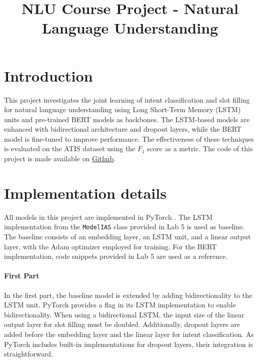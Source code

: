 \documentclass[a4paper]{article}
\title{NLU Course Project - Natural Language Understanding}
\begin{document}
\maketitle


\section{Introduction}
This project investigates the joint learning of intent classification and slot filling for natural language understanding using Long Short-Term Memory (LSTM) units and pre-trained BERT models as backbones. The LSTM-based models are enhanced with bidirectional architecture and dropout layers, while the BERT model is fine-tuned to improve performance. The effectiveness of these techniques is evaluated on the ATIS dataset using the $F_1$ score as a metric. The code of this project is made available on \href{https://github.com/chrisdalvit/nlu-assignment}{Github}.

\section{Implementation details}
All models in this project are implemented in PyTorch \cite{paszke2019pytorchimperativestylehighperformance}. The LSTM \cite{schmidhuber1997long} implementation from the \texttt{ModelIAS} class provided in Lab 5 is used as baseline. The baseline consists of an embedding layer, an LSTM unit, and a linear output layer, with the Adam optimizer employed for training. For the BERT \cite{devlin2019bertpretrainingdeepbidirectional} implementation, code snippets provided in Lab 5 are used as a reference.

\paragraph*{First Part}
In the first part, the baseline model is extended by adding bidirectionality to the LSTM unit. PyTorch provides a flag in its LSTM implementation to enable bidirectionality. When using a bidirectional LSTM, the input size of the linear output layer for slot filling must be doubled. Additionally, dropout layers are added before the embedding layer and the linear layer for intent classification. As PyTorch includes built-in implementations for dropout layers, their integration is straightforward.
\end{document}
